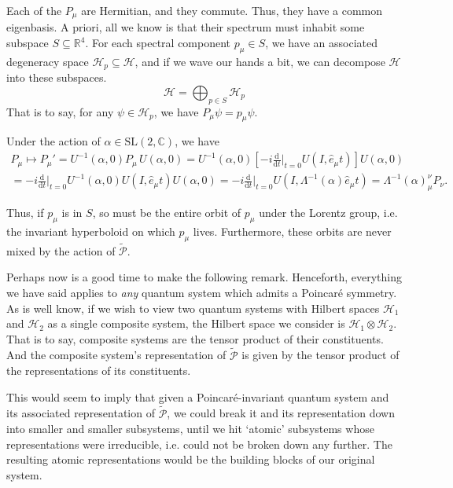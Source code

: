 \documentclass[a4paper]{report}
\newcommand{\tder}[2]{\frac{\text{d} #1}{\text{d} #2}}
\newcommand{\R}{\mathbb{R}}
\newcommand{\C}{\mathbb{C}}
\newcommand{\SL}{\mathrm{SL}}
\theoremstyle{definition}
\theoremstyle{plain}
\theoremstyle{remark}
\begin{document}
Each of the $P_{\mu}$ are Hermitian, and they commute. Thus, they have a common eigenbasis. A priori, all we know is that their spectrum must inhabit some subspace $S \subseteq \R^{4}$. For each spectral component $p_{\mu} \in S$, we have an associated degeneracy space $\mathscr{H}_{p} \subseteq \mathscr{H}$, and if we wave our hands a bit, we can decompose $\mathscr{H}$ into these subspaces.
\begin{equation*}
  \mathscr{H} = \bigoplus_{p \in S} \mathscr{H}_{p}
\end{equation*}
That is to say, for any $\psi \in \mathscr{H}_{p}$, we have $P_{\mu}\psi = p_{\mu}\psi$.

Under the action of $\alpha \in \SL(2, \C)$, we have
\begin{multline*}
  P_\mu \mapsto P_{\mu}' = U^{-1}(\alpha,0) P_\mu\, U(\alpha,0) = U^{-1}(\alpha,0)\left[-i\tder{}{t}\biggr|_{t=0} U(I, \hat{e}_\mu t)\right]U(\alpha,0)\\ = -i\tder{}{t}\biggr|_{t=0}U^{-1}(\alpha,0) U(I, \hat{e}_\mu t)U(\alpha,0) = -i\tder{}{t}\biggr|_{t=0}U\left(I,\Lambda^{-1}(\alpha)\hat{e}_\mu t\right) = \Lambda^{-1}(\alpha)^\nu_\mu P_\nu.
\end{multline*}

Thus, if $p_{\mu}$ is in $S$, so must be the entire orbit of $p_{\mu}$ under the Lorentz group, i.e. the invariant hyperboloid on which $p_{\mu}$ lives. Furthermore, these orbits are never mixed by the action of $\widetilde{\mathcal{P}}$.

Perhaps now is a good time to make the following remark. Henceforth, everything we have said applies to \emph{any} quantum system which admits a Poincar{\'e} symmetry. As is well know, if we wish to view two quantum systems with Hilbert spaces $\mathscr{H}_{1}$ and $\mathscr{H}_{2}$ as a single composite system, the Hilbert space we consider is $\mathscr{H}_{1} \otimes \mathscr{H}_{2}$. That is to say, composite systems are the tensor product of their constituents. And the composite system's representation of $\widetilde{\mathcal{P}}$ is given by the tensor product of the representations of its constituents.

This would seem to imply that given a Poincar{\'e}-invariant quantum system and its associated representation of $\widetilde{\mathcal{P}}$, we could break it and its representation down into smaller and smaller subsystems, until we hit `atomic' subsystems whose representations were irreducible, i.e. could not be broken down any further. The resulting atomic representations would be the building blocks of our original system. 
\end{document}
